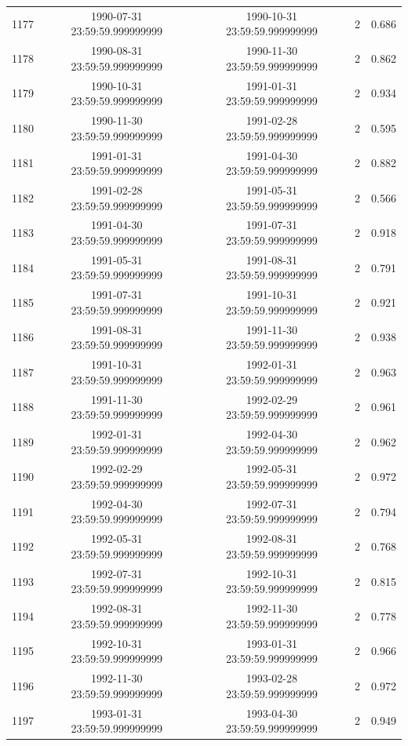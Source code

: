 \begin{table}
\begin{tabular}{lcccc}
1177 & 1990-07-31 23:59:59.999999999 & 1990-10-31 23:59:59.999999999 & 2 & 0.686 \\
1178 & 1990-08-31 23:59:59.999999999 & 1990-11-30 23:59:59.999999999 & 2 & 0.862 \\
1179 & 1990-10-31 23:59:59.999999999 & 1991-01-31 23:59:59.999999999 & 2 & 0.934 \\
1180 & 1990-11-30 23:59:59.999999999 & 1991-02-28 23:59:59.999999999 & 2 & 0.595 \\
1181 & 1991-01-31 23:59:59.999999999 & 1991-04-30 23:59:59.999999999 & 2 & 0.882 \\
1182 & 1991-02-28 23:59:59.999999999 & 1991-05-31 23:59:59.999999999 & 2 & 0.566 \\
1183 & 1991-04-30 23:59:59.999999999 & 1991-07-31 23:59:59.999999999 & 2 & 0.918 \\
1184 & 1991-05-31 23:59:59.999999999 & 1991-08-31 23:59:59.999999999 & 2 & 0.791 \\
1185 & 1991-07-31 23:59:59.999999999 & 1991-10-31 23:59:59.999999999 & 2 & 0.921 \\
1186 & 1991-08-31 23:59:59.999999999 & 1991-11-30 23:59:59.999999999 & 2 & 0.938 \\
1187 & 1991-10-31 23:59:59.999999999 & 1992-01-31 23:59:59.999999999 & 2 & 0.963 \\
1188 & 1991-11-30 23:59:59.999999999 & 1992-02-29 23:59:59.999999999 & 2 & 0.961 \\
1189 & 1992-01-31 23:59:59.999999999 & 1992-04-30 23:59:59.999999999 & 2 & 0.962 \\
1190 & 1992-02-29 23:59:59.999999999 & 1992-05-31 23:59:59.999999999 & 2 & 0.972 \\
1191 & 1992-04-30 23:59:59.999999999 & 1992-07-31 23:59:59.999999999 & 2 & 0.794 \\
1192 & 1992-05-31 23:59:59.999999999 & 1992-08-31 23:59:59.999999999 & 2 & 0.768 \\
1193 & 1992-07-31 23:59:59.999999999 & 1992-10-31 23:59:59.999999999 & 2 & 0.815 \\
1194 & 1992-08-31 23:59:59.999999999 & 1992-11-30 23:59:59.999999999 & 2 & 0.778 \\
1195 & 1992-10-31 23:59:59.999999999 & 1993-01-31 23:59:59.999999999 & 2 & 0.966 \\
1196 & 1992-11-30 23:59:59.999999999 & 1993-02-28 23:59:59.999999999 & 2 & 0.972 \\
1197 & 1993-01-31 23:59:59.999999999 & 1993-04-30 23:59:59.999999999 & 2 & 0.949 \\

\end{tabular}
\end{table}
